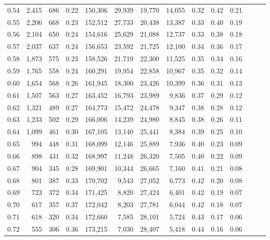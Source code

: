 \begin{tabular}{rrrrrrrrrrrrrr}
0.54 &  2,415 &  686 &  0.22 &  150,306 &   29,939 &  19,770 &  14,055 &  0.32 &  0.42 &      0.21 \\
0.55 &  2,206 &  668 &  0.23 &  152,512 &   27,733 &  20,438 &  13,387 &  0.33 &  0.40 &      0.19 \\
0.56 &  2,104 &  650 &  0.24 &  154,616 &   25,629 &  21,088 &  12,737 &  0.33 &  0.38 &      0.18 \\
0.57 &  2,037 &  637 &  0.24 &  156,653 &   23,592 &  21,725 &  12,100 &  0.34 &  0.36 &      0.17 \\
0.58 &  1,873 &  575 &  0.23 &  158,526 &   21,719 &  22,300 &  11,525 &  0.35 &  0.34 &      0.16 \\
0.59 &  1,765 &  558 &  0.24 &  160,291 &   19,954 &  22,858 &  10,967 &  0.35 &  0.32 &      0.14 \\
0.60 &  1,654 &  568 &  0.26 &  161,945 &   18,300 &  23,426 &  10,399 &  0.36 &  0.31 &      0.13 \\
0.61 &  1,507 &  563 &  0.27 &  163,452 &   16,793 &  23,989 &   9,836 &  0.37 &  0.29 &      0.12 \\
0.62 &  1,321 &  489 &  0.27 &  164,773 &   15,472 &  24,478 &   9,347 &  0.38 &  0.28 &      0.12 \\
0.63 &  1,233 &  502 &  0.29 &  166,006 &   14,239 &  24,980 &   8,845 &  0.38 &  0.26 &      0.11 \\
0.64 &  1,099 &  461 &  0.30 &  167,105 &   13,140 &  25,441 &   8,384 &  0.39 &  0.25 &      0.10 \\
0.65 &    994 &  448 &  0.31 &  168,099 &   12,146 &  25,889 &   7,936 &  0.40 &  0.23 &      0.09 \\
0.66 &    898 &  431 &  0.32 &  168,997 &   11,248 &  26,320 &   7,505 &  0.40 &  0.22 &      0.09 \\
0.67 &    904 &  345 &  0.28 &  169,901 &   10,344 &  26,665 &   7,160 &  0.41 &  0.21 &      0.08 \\
0.68 &    801 &  387 &  0.33 &  170,702 &    9,543 &  27,052 &   6,773 &  0.42 &  0.20 &      0.08 \\
0.69 &    723 &  372 &  0.34 &  171,425 &    8,820 &  27,424 &   6,401 &  0.42 &  0.19 &      0.07 \\
0.70 &    617 &  357 &  0.37 &  172,042 &    8,203 &  27,781 &   6,044 &  0.42 &  0.18 &      0.07 \\
0.71 &    618 &  320 &  0.34 &  172,660 &    7,585 &  28,101 &   5,724 &  0.43 &  0.17 &      0.06 \\
0.72 &    555 &  306 &  0.36 &  173,215 &    7,030 &  28,407 &   5,418 &  0.44 &  0.16 &      0.06 \\

\end{tabular}
